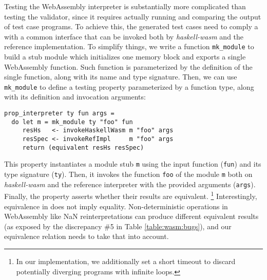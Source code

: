 \documentclass[sigconf, anonymous, review]{acmart}
\begin{document}
Testing the WebAssembly interpreter is substantially more complicated than
testing the validator, since it requires actually running and comparing the
output of test case programs.
%
To achieve this, the generated test cases need to comply a with a common
interface that can be invoked both by \textit{haskell-wasm} and the reference
implementation.
%
To simplify things, we write a function \texttt{mk\_module} to build a stub
module which initializes one memory block and exports a single WebAssembly
function.
%
Such function is parameterized by the definition of the single function, along
with its name and type signature.
%
%
%
Then, we can use \texttt{mk\_module} to define a testing property parameterized
by a function type, along with its definition and invocation arguments:



\begin{verbatim}
prop_interpreter ty fun args =
  do let m = mk_module ty "foo" fun
     resHs   <- invokeHaskellWasm m "foo" args
     resSpec <- invokeRefImpl     m "foo" args
     return (equivalent resHs resSpec)
\end{verbatim}

This property instantiates a module stub \texttt{m} using the input function
(\texttt{fun}) and its type signature (\texttt{ty}).
%
Then, it invokes the function \texttt{foo} of the module \texttt{m} both on
\textit{haskell-wasm} and the reference interpreter with the provided arguments
(\texttt{args}).
%
Finally, the property asserts whether their results are equivalent.%
%
\footnote{In our implementation, we additionally set a short timeout to discard
  potentially diverging programs with infinite loops.}
%
Interestingly, equivalence in does not imply equality.
%
Non-deterministic operations in WebAssembly like NaN reinterpretations can
produce different equivalent results (as exposed by the discrepancy \#5 in Table
\ref{table:wasm:bugs}), and our equivalence relation needs to take that into
account.
%
\end{document}
